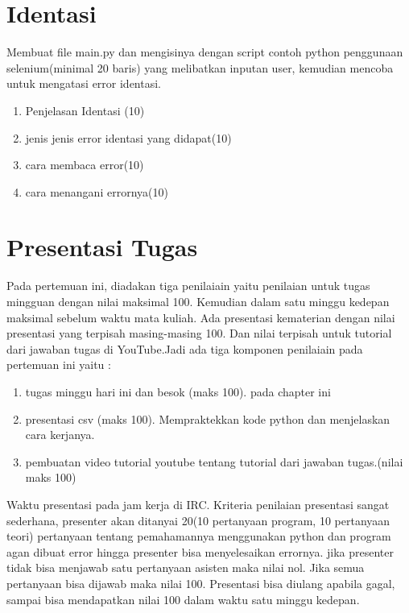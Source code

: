 \section{Identasi}
Membuat file main.py dan mengisinya dengan script contoh python penggunaan selenium(minimal 20 baris) yang melibatkan inputan user, kemudian mencoba untuk mengatasi error identasi.
\begin{enumerate}
	\item
Penjelasan Identasi (10)
	\item
jenis jenis error identasi yang didapat(10)
\item
cara membaca error(10)
\item 
cara menangani errornya(10)
\end{enumerate}

\section{Presentasi Tugas}
Pada pertemuan ini, diadakan tiga penilaiain yaitu penilaian untuk tugas mingguan dengan nilai maksimal 100. Kemudian dalam satu minggu kedepan maksimal sebelum waktu mata kuliah. Ada presentasi kematerian dengan nilai presentasi yang terpisah masing-masing 100. Dan nilai terpisah untuk tutorial dari jawaban tugas di YouTube.Jadi ada tiga komponen penilaiain pada pertemuan ini yaitu :
\begin{enumerate}
	\item tugas minggu hari ini dan besok (maks 100). pada chapter ini
	\item presentasi csv (maks 100). Mempraktekkan kode python dan menjelaskan cara kerjanya.
	\item pembuatan video tutorial youtube tentang tutorial dari jawaban tugas.(nilai maks 100)
\end{enumerate}
Waktu presentasi pada jam kerja di IRC. Kriteria penilaian presentasi sangat sederhana, presenter akan ditanyai 20(10 pertanyaan program, 10 pertanyaan teori) pertanyaan tentang pemahamannya menggunakan python dan program agan dibuat error hingga presenter bisa menyelesaikan errornya. jika presenter tidak bisa menjawab satu pertanyaan asisten maka nilai nol. Jika semua pertanyaan bisa dijawab maka nilai 100. Presentasi bisa diulang apabila gagal, sampai bisa mendapatkan nilai 100 dalam waktu satu minggu kedepan.
